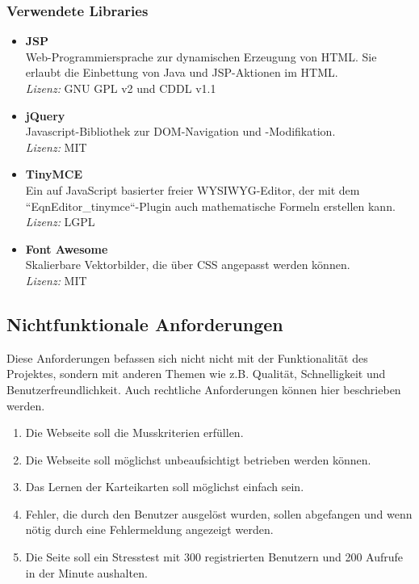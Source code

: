 \subsubsection{Verwendete Libraries}
\begin{itemize}
	\item \textbf{JSP} \\
	Web-Programmiersprache zur dynamischen Erzeugung von HTML. Sie erlaubt die Einbettung von Java und JSP-Aktionen im HTML. \\
	\textit{Lizenz:} GNU GPL v2 und CDDL v1.1
	\item \textbf{jQuery} \\
	Javascript-Bibliothek zur DOM-Navigation und -Modifikation.\\
	\textit{Lizenz:} MIT
	\item \textbf{TinyMCE} \\
	Ein auf JavaScript basierter freier WYSIWYG-Editor, der mit dem ``EqnEditor\_tinymce``-Plugin auch mathematische Formeln erstellen kann. \\
	\textit{Lizenz:} LGPL
	\item \textbf{Font Awesome} \\
	Skalierbare Vektorbilder, die über CSS angepasst werden können. \\
	\textit{Lizenz:} MIT
\end{itemize}


\newpage
\subsection{Nichtfunktionale Anforderungen}
Diese Anforderungen befassen sich nicht nicht mit der Funktionalität des Projektes, sondern mit anderen Themen wie z.B. Qualität, Schnelligkeit und Benutzerfreundlichkeit. Auch rechtliche Anforderungen können hier beschrieben werden.

\begin{enumerate}[leftmargin=2cm, label=\bfseries /NF\arabic*0/]
	 \item Die Webseite soll die Musskriterien erfüllen.
     \item Die Webseite soll möglichst unbeaufsichtigt betrieben werden können.
     \item Das Lernen der Karteikarten soll möglichst einfach sein.
     \item Fehler, die durch den Benutzer ausgelöst wurden, sollen abgefangen und wenn nötig durch eine Fehlermeldung angezeigt werden.
     \item Die Seite soll ein Stresstest mit 300 registrierten Benutzern und 200 Aufrufe in der Minute aushalten.
\end{enumerate}

